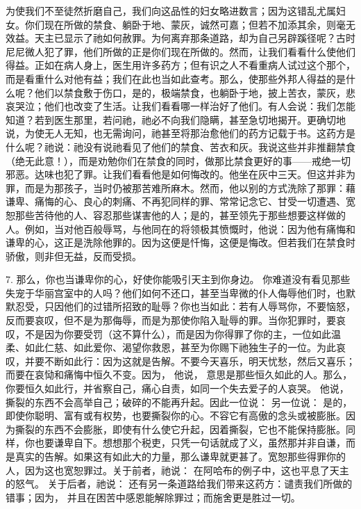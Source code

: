 为使我们不至徒然折磨自己，我们向这品性的妇女略进数言；因为这错乱尤属妇女。你们现在所做的禁食、躺卧于地、蒙灰，诚然可嘉；但若不加添其余，则毫无效益。天主已显示了祂如何赦罪。为何离弃那条道路，却为自己另辟蹊径呢？古时尼尼微人犯了罪，他们所做的正是你们现在所做的。然而，让我们看看什么使他们得益。正如在病人身上，医生用许多药方；但有识之人不看重病人试过这个那个，而是看重什么对他有益；我们在此也当如此查考。那么，使那些外邦人得益的是什么呢？他们以禁食敷于伤口，是的，极端禁食，也躺卧于地，披上苦衣，蒙灰，悲哀哭泣；他们也改变了生活。让我们看看哪一样治好了他们。有人会说：我们怎能知道？若到医生那里，若问祂，祂必不向我们隐瞒，甚至急切地揭开。更确切地说，为使无人无知，也无需询问，祂甚至将那治愈他们的药方记载于书。这药方是什么呢？祂说：祂没有说祂看见了他们的禁食、苦衣和灰。我说这些并非推翻禁食（绝无此意！），而是劝勉你们在禁食的同时，做那比禁食更好的事——戒绝一切邪恶。达味也犯了罪。让我们看看他是如何悔改的。他坐在灰中三天。但这并非为罪，而是为那孩子，当时仍被那苦难所麻木。然而，他以别的方式洗除了那罪：藉谦卑、痛悔的心、良心的刺痛、不再犯同样的罪、常常记念它、甘受一切遭遇、宽恕那些苦待他的人、容忍那些谋害他的人；是的，甚至领先于那些想要这样做的人。例如，当对他百般辱骂，与他同在的将领极其愤慨时，他说：因为他有痛悔和谦卑的心，这正是洗除他罪的。因为这便是忏悔，这便是悔改。但若我们在禁食时骄傲，则非但无益，反而受损。\par

7. 那么，你也当谦卑你的心，好使你能吸引天主到你身边。  你难道没有看见那些失宠于华丽宫室中的人吗？他们如何不还口，甚至当卑微的仆人侮辱他们时，也默默忍受，只因他们的过错所招致的耻辱？你也当如此：若有人辱骂你，不要恼怒，反而要哀叹，但不是为那侮辱，而是为那使你陷入耻辱的罪。当你犯罪时，要哀叹，不是因为你要受罚（这不算什么），而是因为你得罪了你的主，一位如此温柔、如此仁慈、如此爱你、渴望你救恩，甚至为你赐下祂独生子的一位。为此哀叹，并要不断如此行：因为这就是告解。不要今天喜乐，明天忧愁，然后又喜乐；而要在哀恸和痛悔中恒久不变。因为， 他说， 意思是那些恒久如此的人。那么，你要恒久如此行，并省察自己，痛心自责，如同一个失去爱子的人哀哭。 他说，  撕裂的东西不会高举自己；破碎的不能再升起。因此一位说： 另一位说：  是的，即使你聪明、富有或有权势，也要撕裂你的心。不容它有高傲的念头或被膨胀。因为撕裂的东西不会膨胀，即使有什么使它升起，因着撕裂，它也不能保持膨胀。同样，你也要谦卑自下。想想那个税吏，只凭一句话就成了义，虽然那并非自谦，而是真实的告解。如果这有如此大的力量，那么谦卑就更甚了。宽恕那些得罪你的人，因为这也宽恕罪过。关于前者，祂说：  在阿哈布的例子中，这也平息了天主的怒气。 关于后者，祂说： 还有另一条道路给我们带来这药方：谴责我们所做的错事；因为，  并且在困苦中感恩能解除罪过；而施舍更是胜过一切。\par


